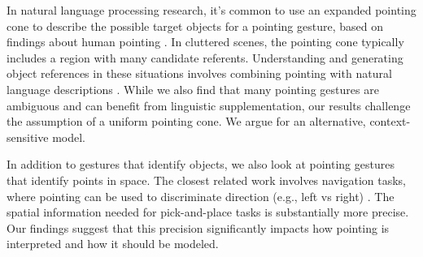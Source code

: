 In natural language processing research, it's common to use an expanded pointing cone to describe the possible target objects for a pointing gesture, based on findings about human pointing \cite{kranstedt2003deixis,rieser2004pointing}. In cluttered scenes, the pointing cone typically includes a region with many candidate referents.  Understanding and generating object references in these situations involves combining pointing with natural language descriptions \cite{han2018placing,kollar2014grounding}.  While we also find that many pointing gestures are ambiguous and can benefit from linguistic supplementation, our results challenge the assumption of a uniform pointing cone. We argue for an alternative, context-sensitive model.

In addition to gestures that identify objects, we also look at pointing gestures that identify points in space. The closest related work involves navigation tasks, where pointing can be used to discriminate direction (e.g., left vs right) \cite{mei2016listen,tellex2011understanding}. The spatial information needed for pick-and-place tasks is substantially more precise. Our findings suggest that this precision significantly impacts how pointing is interpreted and how it should be modeled.



